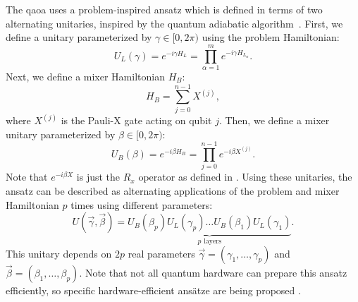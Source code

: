 The \gls{qaoa} uses a problem-inspired ansatz which is defined in terms of two alternating unitaries, inspired by the quantum adiabatic algorithm~\cite{farhi2014quantum}.
First, we define a unitary parameterized by $\gamma \in [0, 2\pi)$ using the problem Hamiltonian:
\begin{equation}
U_L(\gamma) = e^{-i\gamma H_L} = \prod_{\alpha=1}^{m} e^{-i\gamma H_{L_\alpha}}.
\end{equation}
Next, we define a mixer Hamiltonian $H_B$:
\begin{equation}
H_B = \sum_{j=0}^{n-1} X^{(j)},
\end{equation}
where $X^{(j)}$ is the Pauli-X gate acting on qubit $j$.
Then, we define a mixer unitary parameterized by $\beta \in [0, 2\pi)$:
\begin{equation}
U_B(\beta) = e^{-i\beta H_B} = \prod_{j=0}^{n-1} e^{-i\beta X^{(j)}}.
\end{equation}
Note that $e^{-i\beta X}$ is just the $R_x$ operator as defined in .
Using these unitaries, the ansatz can be described as alternating applications of the problem and mixer Hamiltonian $p$ times using different parameters:
\begin{equation}
U(\vec{\gamma}, \vec{\beta}) = \underbrace{U_B(\beta_p)U_L(\gamma_p) \ldots U_B(\beta_1)U_L(\gamma_1)}_{p \:\, \text{layers}}.
\end{equation}
This unitary depends on $2p$ real parameters $\vec{\gamma} = ( \gamma_1,\ldots,\gamma_p )$ and $\vec{\beta} = ( \beta_1,\ldots,\beta_p )$. 
Note that not all quantum hardware can prepare this ansatz efficiently, so specific hardware-efficient ans{\"a}tze are being proposed \cite{kandala2017hardware, farhi2017quantum}.

